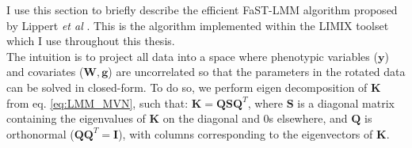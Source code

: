




I use this section to  briefly describe the efficient FaST-LMM algorithm proposed by Lippert \textit{et al} \cite{lippert2011fast}.
This is the algorithm implemented within the LIMIX toolset \cite{lippert2014limix,casale2015efficient} which I use throughout this thesis.\\



The intuition is to project all data into a space where phenotypic variables ($\mathbf{y}$) and covariates ($\mathbf{W}, \mathbf{g}$) are uncorrelated so that the parameters in the rotated data can be solved in closed-form.
To do so, we perform eigen decomposition of $\mathbf{K}$ from eq. \eqref{eq:LMM_MVN}, such that: $\mathbf{K} = \mathbf{Q}\mathbf{S}\mathbf{Q}^T$, where $\mathbf{S}$ is a diagonal matrix containing the eigenvalues of $\mathbf{K}$ on the diagonal and 0s elsewhere, and $\mathbf{Q}$ is orthonormal ($\mathbf{Q}\mathbf{Q}^T = \mathbf{I}$), with columns corresponding to the eigenvectors of $\mathbf{K}$. \\

